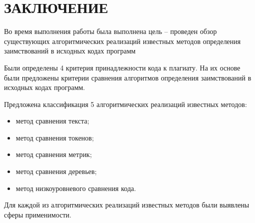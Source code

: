 \section*{ЗАКЛЮЧЕНИЕ}

Во время выполнения работы была выполнена цель --  проведен обзор существующих алгоритмических реализаций известных методов определения заимствований в исходных кодах программ

Были определены 4 критерия принадлежности кода к плагиату. На их основе были предложены критерии сравнения алгоритмов определения заимствований в исходных кодах программ. 

Предложена классификация 5 алгоритмических реализаций известных методов:
\begin{itemize}[label*=---]
	\item метод сравнения текста;
	\item метод сравнения токенов;
	\item метод сравнения метрик;
	\item метод сравнения деревьев;
	\item метод низкоуровневого сравнения кода.
\end{itemize}

Для каждой из алгоритмических реализаций известных методов были выявлены сферы применимости.

\pagebreak